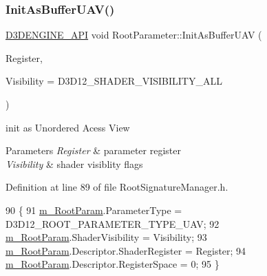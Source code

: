 \subsubsection{\texorpdfstring{Init\+As\+Buffer\+U\+A\+V()}{InitAsBufferUAV()}}
{\footnotesize\ttfamily \mbox{\hyperlink{stdafx_8h_a8ee2d990c5dfba7794dd2b60741d7722}{D3\+D\+E\+N\+G\+I\+N\+E\+\_\+\+A\+PI}} void Root\+Parameter\+::\+Init\+As\+Buffer\+U\+AV (\begin{DoxyParamCaption}\item[{U\+I\+NT}]{Register,  }\item[{D3\+D12\+\_\+\+S\+H\+A\+D\+E\+R\+\_\+\+V\+I\+S\+I\+B\+I\+L\+I\+TY}]{Visibility = {\ttfamily D3D12\+\_\+SHADER\+\_\+VISIBILITY\+\_\+ALL} }\end{DoxyParamCaption})\hspace{0.3cm}{\ttfamily [inline]}}



init as Unordered Acess View 


\begin{DoxyParams}{Parameters}
{\em Register} & parameter register \\
\hline
{\em Visibility} & shader visiblity flags \\
\hline
\end{DoxyParams}


Definition at line 89 of file Root\+Signature\+Manager.\+h.


\begin{DoxyCode}
90     \{
91         \mbox{\hyperlink{class_root_parameter_a66f26d4bb3cd092c625bc083c508fe40}{m\_RootParam}}.ParameterType = D3D12\_ROOT\_PARAMETER\_TYPE\_UAV;
92         \mbox{\hyperlink{class_root_parameter_a66f26d4bb3cd092c625bc083c508fe40}{m\_RootParam}}.ShaderVisibility = Visibility;
93         \mbox{\hyperlink{class_root_parameter_a66f26d4bb3cd092c625bc083c508fe40}{m\_RootParam}}.Descriptor.ShaderRegister = Register;
94         \mbox{\hyperlink{class_root_parameter_a66f26d4bb3cd092c625bc083c508fe40}{m\_RootParam}}.Descriptor.RegisterSpace = 0;
95     \}
\end{DoxyCode}
\mbox{\label{class_root_parameter_ae2442f000f03c59d9e9d03c8472e8b99}} 
